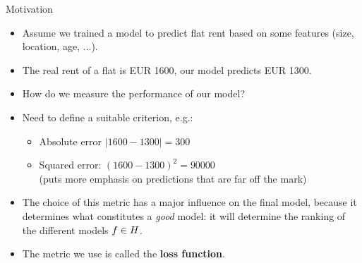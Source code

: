 \documentclass[11pt,compress,t,notes=noshow, xcolor=table]{beamer}
\begin{document}
\begin{vbframe}{Motivation}
  \begin{itemize}
    \item Assume we trained a model to predict flat rent based on some features
    (size, location, age, ...).
    \item The real rent of a flat is EUR 1600, our model predicts EUR 1300.
    \item How do we measure the performance of our model? 
    \item Need to define a suitable criterion, e.g.:
    \begin{itemize}
      \item Absolute error $|1600 - 1300| = 300$
      \item Squared error: $(1600 - 1300)^2 = 90000$\\
      (puts more emphasis on predictions that are far off the mark)
    \end{itemize}
    \item The choice of this metric has a major influence on the final model, because it determines what constitutes a \emph{good} model: it will determine the ranking of the different models $f \in H$.
    \item The metric we use is called the \textbf{loss function}. 
  \end{itemize}
\end{vbframe}
\end{document}
